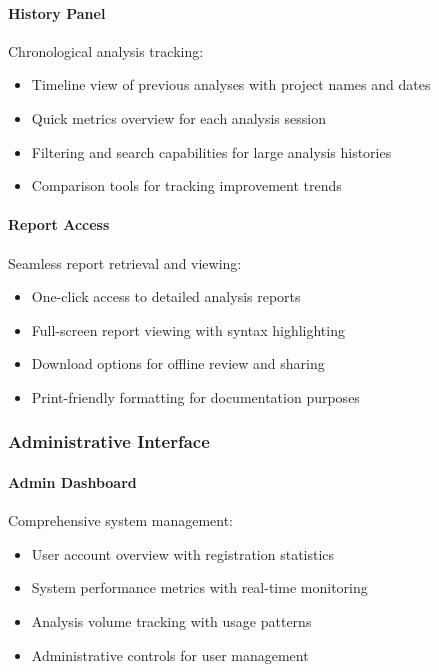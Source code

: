 \documentclass[12pt,a4paper]{article}
\begin{document}
    \paragraph{History Panel}
    Chronological analysis tracking:
    \begin{itemize}[leftmargin=0.5in]
        \item Timeline view of previous analyses with project names and dates
        \item Quick metrics overview for each analysis session
        \item Filtering and search capabilities for large analysis histories
        \item Comparison tools for tracking improvement trends
    \end{itemize}

    \paragraph{Report Access}
    Seamless report retrieval and viewing:
    \begin{itemize}[leftmargin=0.5in]
        \item One-click access to detailed analysis reports
        \item Full-screen report viewing with syntax highlighting
        \item Download options for offline review and sharing
        \item Print-friendly formatting for documentation purposes
    \end{itemize}

    \subsubsection{Administrative Interface}

    \paragraph{Admin Dashboard}
    Comprehensive system management:
    \begin{itemize}[leftmargin=0.5in]
        \item User account overview with registration statistics
        \item System performance metrics with real-time monitoring
        \item Analysis volume tracking with usage patterns
        \item Administrative controls for user management
    \end{itemize}
\end{document}
